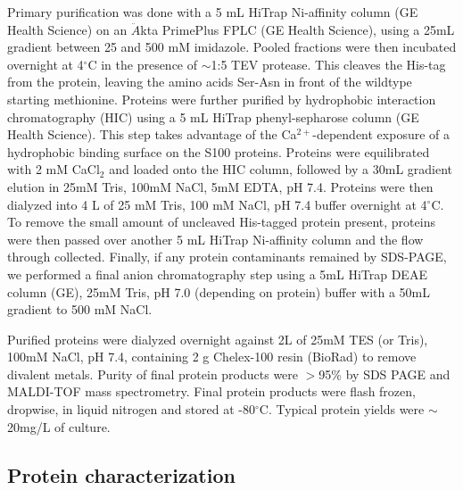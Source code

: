 Primary purification was done with a 5 mL HiTrap Ni-affinity column
(GE Health Science) on an $\ddot{A}$kta PrimePlus FPLC (GE Health
Science), using a 25mL gradient between 25 and 500 mM imidazole. Pooled
fractions were then incubated overnight at 4$^{\circ}$C in the presence
of $\sim$1:5 TEV protease. This cleaves the His-tag from the protein,
leaving the amino acids Ser-Asn in front of the wildtype starting
methionine. Proteins were further purified by hydrophobic interaction
chromatography (HIC) using a 5 mL HiTrap phenyl-sepharose column (GE
Health Science). This step takes advantage of the Ca$^{2+}$-dependent
exposure of a hydrophobic binding surface on the S100 proteins. Proteins
were equilibrated with 2 mM CaCl$_{2}$ and loaded onto the HIC column,
followed by a 30mL gradient elution in 25mM Tris, 100mM NaCl, 5mM
EDTA, pH 7.4. Proteins were then dialyzed into 4 L of 25 mM Tris,
100 mM NaCl, pH 7.4 buffer overnight at 4$^{\circ}$C. To remove the
small amount of uncleaved His-tagged protein present, proteins were
then passed over another 5 mL HiTrap Ni-affinity column and the flow
through collected. Finally, if any protein contaminants remained by
SDS-PAGE, we performed a final anion chromatography step using a 5mL
HiTrap DEAE column (GE), 25mM Tris, pH 7.0 (depending
on protein) buffer with a 50mL gradient to 500 mM NaCl.

Purified proteins were dialyzed overnight against 2L of 25mM TES (or
Tris), 100mM NaCl, pH 7.4, containing 2 g Chelex-100 resin (BioRad)
to remove divalent metals. Purity of final protein products were $>$95\%
by SDS PAGE and MALDI-TOF mass spectrometry. Final protein products
were flash frozen, dropwise, in liquid nitrogen and stored at -80$^{\circ}$C.
Typical protein yields were $\sim$20mg/L of culture.

\subsection{Protein characterization}

